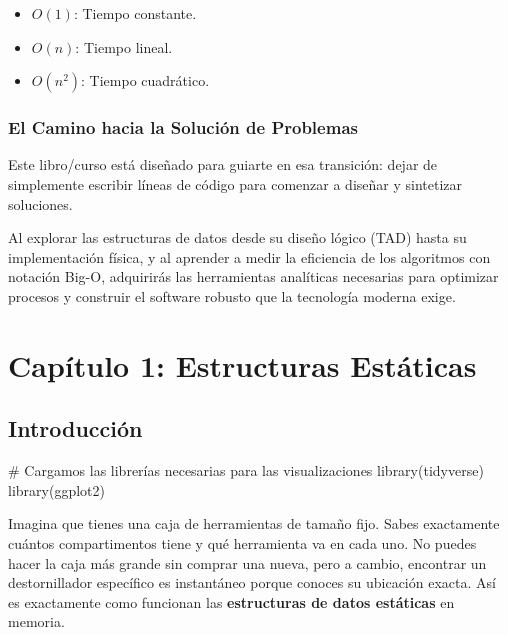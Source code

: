 \documentclass[
  spanish,
  letterpaper,
  DIV=11,
  numbers=noendperiod]{scrreprt}
\newenvironment{Shaded}{\begin{snugshade}}{\end{snugshade}}
\newcommand{\CommentTok}[1]{\textcolor[rgb]{0.37,0.37,0.37}{#1}}
\newcommand{\FunctionTok}[1]{\textcolor[rgb]{0.28,0.35,0.67}{#1}}
\newcommand{\NormalTok}[1]{\textcolor[rgb]{0.00,0.23,0.31}{#1}}
\providecommand{\tightlist}{%
  \setlength{\itemsep}{0pt}\setlength{\parskip}{0pt}}
\begin{document}
\begin{itemize}
\tightlist
\item
  \(O(1)\): Tiempo constante.
\item
  \(O(n)\): Tiempo lineal.
\item
  \(O(n^2)\): Tiempo cuadrático.
\end{itemize}

\subsection{El Camino hacia la Solución de
Problemas}\label{el-camino-hacia-la-soluciuxf3n-de-problemas}

Este libro/curso está diseñado para guiarte en esa transición: dejar de
simplemente escribir líneas de código para comenzar a diseñar y
sintetizar soluciones.

Al explorar las estructuras de datos desde su diseño lógico (TAD) hasta
su implementación física, y al aprender a medir la eficiencia de los
algoritmos con notación Big-O, adquirirás las herramientas analíticas
necesarias para optimizar procesos y construir el software robusto que
la tecnología moderna exige.


\chapter{Capítulo 1: Estructuras
Estáticas}\label{capuxedtulo-1-estructuras-estuxe1ticas}

\section{Introducción}\label{sec-intro-estaticas}

\begin{Shaded}
\begin{Highlighting}[]
\CommentTok{\# Cargamos las librerías necesarias para las visualizaciones}
\FunctionTok{library}\NormalTok{(tidyverse)}
\FunctionTok{library}\NormalTok{(ggplot2)}
\end{Highlighting}
\end{Shaded}

Imagina que tienes una caja de herramientas de tamaño fijo. Sabes
exactamente cuántos compartimentos tiene y qué herramienta va en cada
uno. No puedes hacer la caja más grande sin comprar una nueva, pero a
cambio, encontrar un destornillador específico es instantáneo porque
conoces su ubicación exacta. Así es exactamente como funcionan las
\textbf{estructuras de datos estáticas} en memoria.
\end{document}
